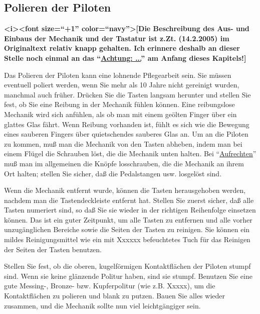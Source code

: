 {\label{c2_7b}
\subsection{Polieren der Piloten}
\label{c2_7_pilo} 

\textbf{<i><font size=\enquote{+1} color=\enquote{navy}>[Die Beschreibung des  Aus- und Einbaus der Mechanik und der Tastatur ist z.Zt. (14.2.2005) im Originaltext relativ knapp gehalten.
Ich erinnere deshalb an dieser Stelle noch einmal an das \enquote{\hyperref[c2_1]{Achtung: ...}} am Anfang dieses Kapitels!]}}

Das Polieren der Piloten kann eine lohnende Pflegearbeit sein.
Sie müssen eventuell poliert werden, wenn Sie mehr als 10 Jahre nicht gereinigt wurden, manchmal auch früher.
Drücken Sie die Tasten langsam herunter und stellen Sie fest, ob Sie eine Reibung in der Mechanik fühlen können.
Eine reibungslose Mechanik wird sich anfühlen, als ob man mit einem geölten Finger über ein glattes Glas fährt.
Wenn Reibung vorhanden ist, fühlt es sich wie die Bewegung eines sauberen Fingers über quietschendes sauberes Glas an.
Um an die Piloten zu kommen, muß man die Mechanik von den Tasten abheben, indem man bei einem Flügel die Schrauben löst, die die Mechanik unten halten.
Bei \enquote{\hyperref[upright]{Aufrechten}} muß man im allgemeinen die Knöpfe losschrauben, die die Mechanik an ihrem Ort halten; stellen Sie sicher, daß die Pedalstangen usw. losgelöst sind.

Wenn die Mechanik entfernt wurde, können die Tasten herausgehoben werden, nachdem man die Tastendeckleiste entfernt hat.
Stellen Sie zuerst sicher, daß alle Tasten numeriert sind, so daß Sie sie wieder in der richtigen Reihenfolge einsetzen können.
Das ist ein guter Zeitpunkt, um alle Tasten zu entfernen und alle vorher unzugänglichen Bereiche sowie die Seiten der Tasten zu reinigen.
Sie können ein mildes Reinigungsmittel wie ein mit Xxxxxx befeuchtetes Tuch für das Reinigen der Seiten der Tasten benutzen.

Stellen Sie fest, ob die oberen, kugelförmigen Kontaktflächen der Piloten stumpf sind.
Wenn sie keine glänzende Politur haben, sind sie stumpf.
Benutzen Sie eine gute Messing-, Bronze- bzw. Kupferpolitur (wie z.B. Xxxxx), um die Kontaktflächen zu polieren und blank zu putzen.
Bauen Sie alles wieder zusammen, und die Mechanik sollte nun viel leichtgängiger sein.
 




